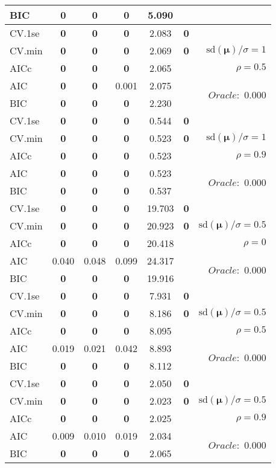 \begin{table}
\begin{center}
\begin{tabular}{l*{5}{c}|r}
BIC & {\bf 0} & {\bf 0} & {\bf 0} & 5.090 & &  \\
 \hline 
CV.1se & {\bf 0} & {\bf 0} & {\bf 0} & 2.083 & {\bf 0} & \\
CV.min & {\bf 0} & {\bf 0} & {\bf 0} & 2.069 & {\bf 0} &  $\mathrm{sd}(\mathbf{\mu})/\sigma=1$ \\
AICc & {\bf 0} & {\bf 0} & {\bf 0} & 2.065 & & $\rho=0.5$ \\
AIC & {\bf 0} & {\bf 0} & 0.001 & 2.075 & &  \multirow{2}{*}{$Oracle: $ 0.000} \\
BIC & {\bf 0} & {\bf 0} & {\bf 0} & 2.230 & &  \\
 \hline 
CV.1se & {\bf 0} & {\bf 0} & {\bf 0} & 0.544 & {\bf 0} & \\
CV.min & {\bf 0} & {\bf 0} & {\bf 0} & 0.523 & {\bf 0} &  $\mathrm{sd}(\mathbf{\mu})/\sigma=1$ \\
AICc & {\bf 0} & {\bf 0} & {\bf 0} & 0.523 & & $\rho=0.9$ \\
AIC & {\bf 0} & {\bf 0} & {\bf 0} & 0.523 & &  \multirow{2}{*}{$Oracle: $ 0.000} \\
BIC & {\bf 0} & {\bf 0} & {\bf 0} & 0.537 & &  \\
 \hline 
CV.1se & {\bf 0} & {\bf 0} & {\bf 0} & 19.703 & {\bf 0} & \\
CV.min & {\bf 0} & {\bf 0} & {\bf 0} & 20.923 & {\bf 0} &  $\mathrm{sd}(\mathbf{\mu})/\sigma=0.5$ \\
AICc & {\bf 0} & {\bf 0} & {\bf 0} & 20.418 & & $\rho=0$ \\
AIC & 0.040 & 0.048 & 0.099 & 24.317 & &  \multirow{2}{*}{$Oracle: $ 0.000} \\
BIC & {\bf 0} & {\bf 0} & {\bf 0} & 19.916 & &  \\
 \hline 
CV.1se & {\bf 0} & {\bf 0} & {\bf 0} & 7.931 & {\bf 0} & \\
CV.min & {\bf 0} & {\bf 0} & {\bf 0} & 8.186 & {\bf 0} &  $\mathrm{sd}(\mathbf{\mu})/\sigma=0.5$ \\
AICc & {\bf 0} & {\bf 0} & {\bf 0} & 8.095 & & $\rho=0.5$ \\
AIC & 0.019 & 0.021 & 0.042 & 8.893 & &  \multirow{2}{*}{$Oracle: $ 0.000} \\
BIC & {\bf 0} & {\bf 0} & {\bf 0} & 8.112 & &  \\
 \hline 
CV.1se & {\bf 0} & {\bf 0} & {\bf 0} & 2.050 & {\bf 0} & \\
CV.min & {\bf 0} & {\bf 0} & {\bf 0} & 2.023 & {\bf 0} &  $\mathrm{sd}(\mathbf{\mu})/\sigma=0.5$ \\
AICc & {\bf 0} & {\bf 0} & {\bf 0} & 2.025 & & $\rho=0.9$ \\
AIC & 0.009 & 0.010 & 0.019 & 2.034 & &  \multirow{2}{*}{$Oracle: $ 0.000} \\
BIC & {\bf 0} & {\bf 0} & {\bf 0} & 2.065 & &  \\
 \hline 
\end{tabular}
\end{center}
\vspace{-1cm}
\end{table}




